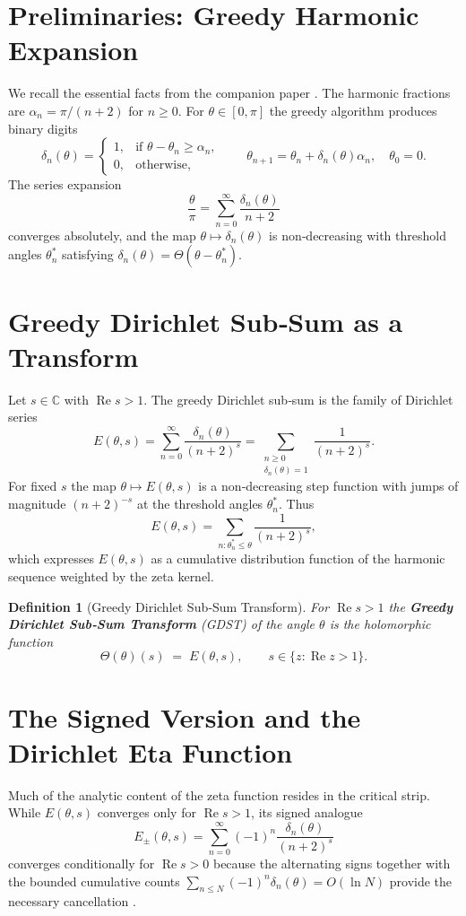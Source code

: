 \documentclass[11pt,a4paper]{article}
\newtheorem{definition}{Definition}[section]
\begin{document}
\section{Preliminaries: Greedy Harmonic Expansion}
We recall the essential facts from the companion paper \cite{Geere2026GHeta}.  The harmonic fractions are \(\alpha_n=\pi/(n+2)\) for \(n\ge 0\).  For \(\theta\in[0,\pi]\) the greedy algorithm produces binary digits
\[
\delta_n(\theta)=
\begin{cases}
1, & \text{if }\theta-\theta_n\ge\alpha_n,\\
0, & \text{otherwise},
\end{cases}
\qquad
\theta_{n+1}=\theta_n+\delta_n(\theta)\alpha_n,\quad \theta_0=0.
\]
The series expansion
\[
\frac{\theta}{\pi} = \sum_{n=0}^{\infty}\frac{\delta_n(\theta)}{n+2}
\]
converges absolutely, and the map \(\theta\mapsto\delta_n(\theta)\) is non‑decreasing with threshold angles \(\theta_n^*\) satisfying \(\delta_n(\theta)=\Theta(\theta-\theta_n^*)\).

\section{Greedy Dirichlet Sub‑Sum as a Transform}
Let \(s\in\mathbb{C}\) with \(\operatorname{Re}s>1\).  The greedy Dirichlet sub‑sum is the family of Dirichlet series
\[
E(\theta,s) = \sum_{n=0}^{\infty} \frac{\delta_n(\theta)}{(n+2)^s}
           = \sum_{\substack{n\ge 0\\\delta_n(\theta)=1}} \frac{1}{(n+2)^s}.
\]
For fixed \(s\) the map \(\theta\mapsto E(\theta,s)\) is a non‑decreasing step function with jumps of magnitude \((n+2)^{-s}\) at the threshold angles \(\theta_n^*\).  Thus
\[
E(\theta,s) = \sum_{n: \theta_n^*\le\theta} \frac{1}{(n+2)^s},
\]
which expresses \(E(\theta,s)\) as a cumulative distribution function of the harmonic sequence weighted by the zeta kernel.

\begin{definition}[Greedy Dirichlet Sub‑Sum Transform]\label{def:GDST}
For \(\operatorname{Re}s>1\) the \textbf{Greedy Dirichlet Sub‑Sum Transform} (GDST) of the angle \(\theta\) is the holomorphic function
\[
\Theta(\theta)(s) \;=\; E(\theta,s),\qquad s\in\{z:\operatorname{Re}z>1\}.
\]
\end{definition}

\section{The Signed Version and the Dirichlet Eta Function}
Much of the analytic content of the zeta function resides in the critical strip.  While \(E(\theta,s)\) converges only for \(\operatorname{Re}s>1\), its signed analogue
\[
E_\pm(\theta,s) = \sum_{n=0}^{\infty} (-1)^n \frac{\delta_n(\theta)}{(n+2)^s}
\]
converges conditionally for \(\operatorname{Re}s>0\) because the alternating signs together with the bounded cumulative counts \(\sum_{n\le N}(-1)^n\delta_n(\theta) = O(\ln N)\) provide the necessary cancellation \cite{Geere2026GHeta}.
\end{document}

